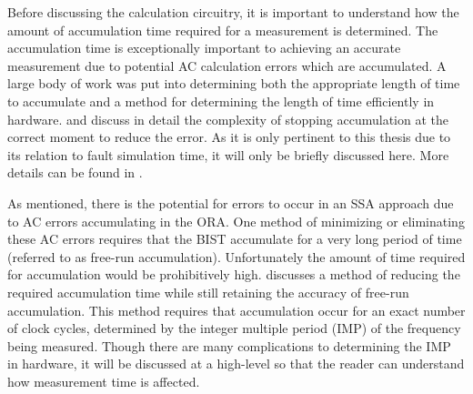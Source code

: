 \documentclass[12pt]{report}
\begin{document}
Before discussing the calculation circuitry, it is important to understand how the amount of accumulation time required for a measurement is determined.  The accumulation time is exceptionally important to achieving an accurate measurement due to potential AC calculation errors which are accumulated\cite{jie}.  A large body of work was put into determining both the appropriate length of time to accumulate and a method for determining the length of time efficiently in hardware.  \cite{jie} and \cite{testtime} discuss in detail the complexity of stopping accumulation at the correct moment to reduce the error.  As it is only pertinent to this thesis due to its relation to fault simulation time, it will only be briefly discussed here.  More details can be found in \cite{jie}.

As mentioned, there is the potential for errors to occur in an SSA approach due to AC errors accumulating in the ORA\cite{jie}.  One method of minimizing or eliminating these AC errors requires that the BIST accumulate for a very long period of time (referred to as free-run accumulation).  Unfortunately the amount of time required for accumulation would be prohibitively high\cite{testtime}.  \cite{jie} discusses a method of reducing the required accumulation time while still retaining the accuracy of free-run accumulation.  This method requires that accumulation occur for an exact number of clock cycles, determined by the integer multiple period (IMP) of the frequency being measured.  Though there are many complications to determining the IMP in hardware, it will be discussed at a high-level so that the reader can understand how measurement time is affected.
\end{document}
